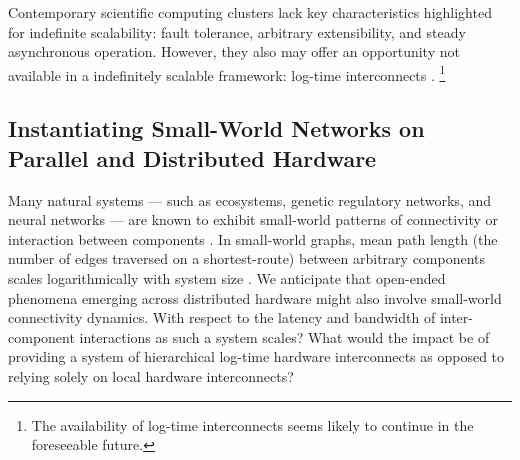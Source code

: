 Contemporary scientific computing clusters lack key characteristics highlighted for indefinite scalability: fault tolerance, arbitrary extensibility, and steady asynchronous operation. %
However, they also may offer an opportunity not available in a indefinitely scalable framework: log-time interconnects \citep{mollah2018comparative}.
\footnote{
The availability of log-time interconnects seems likely to continue in the foreseeable future.
}

\subsection{Instantiating Small-World Networks on Parallel and Distributed Hardware}

Many natural systems --- such as ecosystems, genetic regulatory networks, and neural networks --- are known to exhibit small-world patterns of connectivity or interaction between components \citep{bassett2017small, fox2014herbivores, gaiteri2014beyond}.
In small-world graphs, mean path length (the number of edges traversed on a shortest-route) between arbitrary components scales logarithmically with system size \citep{watts1998collective}.
We anticipate that open-ended phenomena emerging across distributed hardware might also involve small-world connectivity dynamics.
With respect to the latency and bandwidth of inter-component interactions as such a system scales?
What would the impact be of providing a system of hierarchical log-time hardware interconnects as opposed to relying solely on local hardware interconnects?

